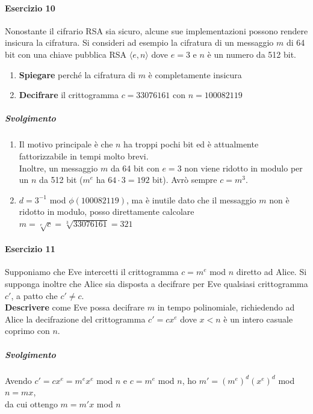 \documentclass[10pt]{book}
\begin{document}
\paragraph{Esercizio 10} Nonostante il cifrario RSA sia sicuro, alcune sue implementazioni possono rendere insicura la cifratura. Si consideri ad esempio la cifratura di un messaggio $m$ di 64 bit con una chiave pubblica RSA $\langle e,n\rangle$ dove $e=3$ e $n$ è un numero da 512 bit.\begin{enumerate}
	\item \textbf{Spiegare} perché la cifratura di $m$ è completamente insicura
	\item \textbf{Decifrare} il crittogramma $c = 33076161$ con $n = 100082119$
\end{enumerate}
\subparagraph{Svolgimento} \begin{enumerate}
	\item Il motivo principale è che $n$ ha troppi pochi bit ed è attualmente fattorizzabile in tempi molto brevi.\\
	Inoltre, un messaggio $m$ da 64 bit con $e=3$ non viene ridotto in modulo per un $n$ da 512 bit ($m^e$ ha $64\cdot3=192$ bit). Avrò sempre $c = m^3$.
	\item $d = 3^{-1}$ mod $\phi(100082119)$, ma è inutile dato che il messaggio $m$ non è ridotto in modulo, posso direttamente calcolare $m = \sqrt[e]{c} = \sqrt[3]{33076161} = 321$
\end{enumerate}
\paragraph{Esercizio 11} Supponiamo che Eve intercetti il crittogramma $c = m^e$ mod $n$ diretto ad Alice. Si supponga inoltre che Alice sia disposta a decifrare per Eve qualsiasi crittogramma $c'$, a patto che $c'\neq c$.\\
\textbf{Descrivere} come Eve possa decifrare $m$ in tempo polinomiale, richiedendo ad Alice la decifrazione del crittogramma $c' = cx^e$ dove $x<n$ è un intero casuale coprimo con $n$.
\subparagraph{Svolgimento} Avendo $c' = cx^e = m^ex^e$ mod $n$ e $c = m^e$ mod $n$, ho $m' = (m^e)^d(x^e)^d$ mod $n = mx$,\\da cui ottengo $m = m'x$ mod $n$
\end{document}
